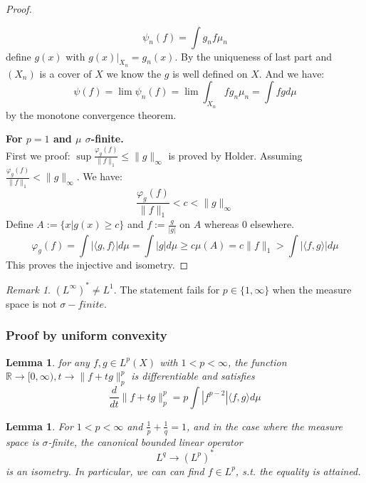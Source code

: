 \documentclass[a4paper,11pt,fleqn]{book}
\newtheorem{lemma}[theorem]{Lemma}
\theoremstyle{definition}
\theoremstyle{remark}
\newtheorem*{remark}{Remark}
\begin{document}
\begin{proof}
\begin{itemize}
			\begin{equation*}
				\psi_n(f) = \int g_n f \mu_n
			\end{equation*}
			define $g(x)$ with $g(x)|_{X_n} = g_n(x)$. By the uniqueness of last part and $(X_n)$ is a cover of $X$ we know the $g$ is well defined on $X$. And we have:
			\begin{equation*}
				\psi(f) = \lim \psi_n(f) = \lim \int_{X_n}f g_n \mu_n= \int f gd\mu
			\end{equation*}           
			by the monotone convergence theorem.
	\end{itemize}
	\textbf{For $p = 1$ and $\mu$ $\sigma$-finite.} \\
	First we proof:
	$\sup \frac{\varphi_g(f)}{\|f\|_1} \leq \|g\|_\infty$ is proved by Holder. Assuming $\frac{\varphi_g(f)}{\|f\|_1} < \|g\|_\infty$. We have:
	\begin{equation*}
		\frac{\varphi_g(f)}{\|f\|_1} < c < \|g\|_\infty
	\end{equation*}
	Define $A := \{x| g(x) \geq c\}$ and $f := \frac{g}{|g|}$ on $A$ whereas 0 elsewhere.
	\begin{equation*}
		\varphi_g(f) = \int | \langle g, f \rangle| d\mu = \int |g| d\mu
		\geq c \mu(A) = c\|f\|_1 > \int |\langle f, g \rangle|   d\mu
 	\end{equation*}
 	This proves the injective and isometry.
\end{proof}
\begin{remark}
	 $(L^\infty)^* \neq L^1$.  The statement fails for $p \in \{1, \infty\}$ when the measure space is not $\sigma-finite$.
\end{remark}

\subsubsection*{Proof by uniform convexity}
\begin{lemma}
	for any $f, g \in L^p(X)$ with $1 < p < \infty$, the function $\mathbb{R} \rightarrow [0, \infty), t \rightarrow \|f + tg\|^p_p$ is differentiable and satisfies
	\begin{equation*}
		\frac{d}{dt} \|f + tg\|^p_p = p\int |f^{p -2}|\langle f, g\rangle d\mu
	\end{equation*}
\end{lemma}

\begin{lemma}
	For $1 < p < \infty$ and $\frac{1}{p} + \frac{1}{q} = 1$, and in the case where the measure space is $\sigma$-finite, the canonical bounded linear operator
	\begin{equation*}
		L^q \rightarrow (L^p)^*
	\end{equation*}
	 is an isometry. In particular, we can can find $f\in L^p$, s.t. the equality is attained.
\end{lemma}
\end{document}
